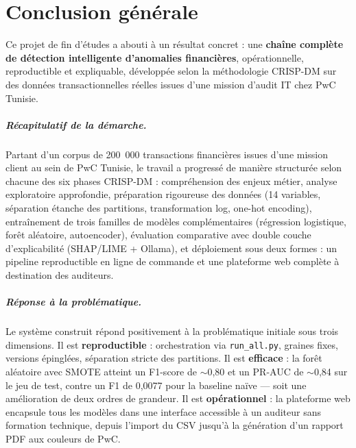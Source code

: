 \documentclass[12pt,a4paper,twoside]{report}
\begin{document}
\chapter*{Conclusion générale}

Ce projet de fin d'études a abouti à un résultat concret : une \textbf{chaîne complète de détection intelligente d'anomalies financières}, opérationnelle, reproductible et expliquable, développée selon la méthodologie CRISP-DM sur des données transactionnelles réelles issues d'une mission d'audit IT chez PwC Tunisie.

\paragraph{Récapitulatif de la démarche.} Partant d'un corpus de 200~000 transactions financières issues d'une mission client au sein de PwC Tunisie, le travail a progressé de manière structurée selon chacune des six phases CRISP-DM : compréhension des enjeux métier, analyse exploratoire approfondie, préparation rigoureuse des données (14 variables, séparation étanche des partitions, transformation log, one-hot encoding), entraînement de trois familles de modèles complémentaires (régression logistique, forêt aléatoire, autoencoder), évaluation comparative avec double couche d'explicabilité (SHAP/LIME + Ollama), et déploiement sous deux formes : un pipeline reproductible en ligne de commande et une plateforme web complète à destination des auditeurs.

\paragraph{Réponse à la problématique.} Le système construit répond positivement à la problématique initiale sous trois dimensions. Il est \textbf{reproductible} : orchestration via \texttt{run\_all.py}, graines fixes, versions épinglées, séparation stricte des partitions. Il est \textbf{efficace} : la forêt aléatoire avec SMOTE atteint un F1-score de $\sim$0,80 et un PR-AUC de $\sim$0,84 sur le jeu de test, contre un F1 de 0,0077 pour la baseline naïve --- soit une amélioration de deux ordres de grandeur. Il est \textbf{opérationnel} : la plateforme web encapsule tous les modèles dans une interface accessible à un auditeur sans formation technique, depuis l'import du CSV jusqu'à la génération d'un rapport PDF aux couleurs de PwC.
\end{document}
